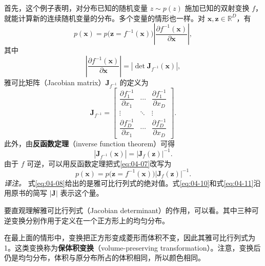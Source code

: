 
首先，这个例子表明，对分布已知的随机变量 $z\sim p(z)$ 施加已知的双射变换 $f$，就能计算新的连续随机变量的分布。多个变量的情形也一样。对 $\mathbf{x},\mathbf{z}\in\mathbb{R}^D$，有
\begin{equation}
p(\mathbf{x})=p\bigl(\mathbf{z}=f^{-1}(\mathbf{x})\bigr)
\left|\frac{\partial f^{-1}(\mathbf{x})}{\partial\mathbf{x}}\right|,
\tag{4.7}\label{eq:04-07}
\end{equation}
其中
\begin{equation}
\left|\frac{\partial f^{-1}(\mathbf{x})}{\partial\mathbf{x}}\right|
=\left|\det\mathbf{J}_{f^{-1}}(\mathbf{x})\right|,
\tag{4.8}\label{eq:04-08}
\end{equation}
雅可比矩阵（Jacobian matrix）$\mathbf{J}_{f^{-1}}$ 的定义为
\begin{equation}
\mathbf{J}_{f^{-1}}=
\begin{bmatrix}
\dfrac{\partial f_1^{-1}}{\partial x_1} & \cdots & \dfrac{\partial f_1^{-1}}{\partial x_D}\\
\vdots & \ddots & \vdots\\
\dfrac{\partial f_D^{-1}}{\partial x_1} & \cdots & \dfrac{\partial f_D^{-1}}{\partial x_D}
\end{bmatrix}.
\tag{4.9}\label{eq:04-09}
\end{equation}
此外，由\textbf{反函数定理}（inverse function theorem）可得
\begin{equation}
\left|\mathbf{J}_{f^{-1}}(\mathbf{x})\right|
=\left|\mathbf{J}_{f}(\mathbf{z})\right|^{-1}.
\tag{4.10}\label{eq:04-10}
\end{equation}
由于 $f$ 可逆，可以用反函数定理把式\eqref{eq:04-07}改写为
\begin{equation}
p(\mathbf{x})=p\bigl(\mathbf{z}=f^{-1}(\mathbf{x})\bigr)
\left|\mathbf{J}_{f}(\mathbf{z})\right|^{-1}.
\tag{4.11}\label{eq:04-11}
\end{equation}
\emph{译注。} 式\eqref{eq:04-08}给出的是雅可比行列式的绝对值。式\eqref{eq:04-10}和式\eqref{eq:04-11}沿用原书的简写 $|\mathbf{J}|$ 表示这个量。

要直观理解雅可比行列式（Jacobian determinant）的作用，可以看。其中三种可逆变换分别作用于定义在一个正方形上的均匀分布。

在最上面的情形中，变换把正方形变成菱形而体积不变，因此其雅可比行列式为 1。这类变换称为\textbf{保体积变换}（volume-preserving transformation）。注意，变换后仍是均匀分布，体积与原分布所占的体积相同，所以颜色相同。

